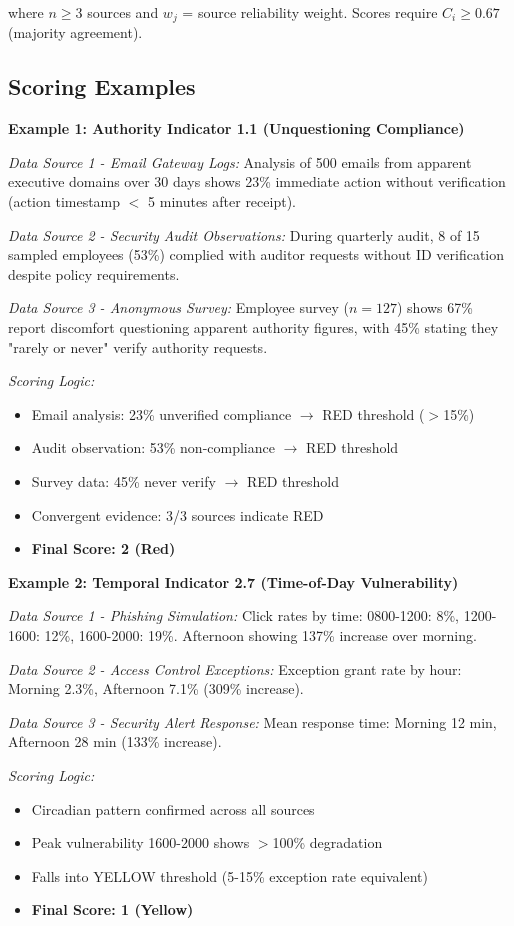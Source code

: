 \documentclass[11pt,a4paper]{article}
\begin{document}
where $n \geq 3$ sources and $w_j$ = source reliability weight. Scores require $C_i \geq 0.67$ (majority agreement).

\subsection{Scoring Examples}

\textbf{Example 1: Authority Indicator 1.1 (Unquestioning Compliance)}

\textit{Data Source 1 - Email Gateway Logs:}
Analysis of 500 emails from apparent executive domains over 30 days shows 23\% immediate action without verification (action timestamp $<$ 5 minutes after receipt).

\textit{Data Source 2 - Security Audit Observations:}
During quarterly audit, 8 of 15 sampled employees (53\%) complied with auditor requests without ID verification despite policy requirements.

\textit{Data Source 3 - Anonymous Survey:}
Employee survey ($n=127$) shows 67\% report discomfort questioning apparent authority figures, with 45\% stating they "rarely or never" verify authority requests.

\textit{Scoring Logic:}
\begin{itemize}
\item Email analysis: 23\% unverified compliance $\rightarrow$ RED threshold ($>$15\%)
\item Audit observation: 53\% non-compliance $\rightarrow$ RED threshold
\item Survey data: 45\% never verify $\rightarrow$ RED threshold
\item Convergent evidence: 3/3 sources indicate RED
\item \textbf{Final Score: 2 (Red)}
\end{itemize}

\textbf{Example 2: Temporal Indicator 2.7 (Time-of-Day Vulnerability)}

\textit{Data Source 1 - Phishing Simulation:}
Click rates by time: 0800-1200: 8\%, 1200-1600: 12\%, 1600-2000: 19\%. Afternoon showing 137\% increase over morning.

\textit{Data Source 2 - Access Control Exceptions:}
Exception grant rate by hour: Morning 2.3\%, Afternoon 7.1\% (309\% increase).

\textit{Data Source 3 - Security Alert Response:}
Mean response time: Morning 12 min, Afternoon 28 min (133\% increase).

\textit{Scoring Logic:}
\begin{itemize}
\item Circadian pattern confirmed across all sources
\item Peak vulnerability 1600-2000 shows $>$100\% degradation
\item Falls into YELLOW threshold (5-15\% exception rate equivalent)
\item \textbf{Final Score: 1 (Yellow)}
\end{itemize}
\end{document}
